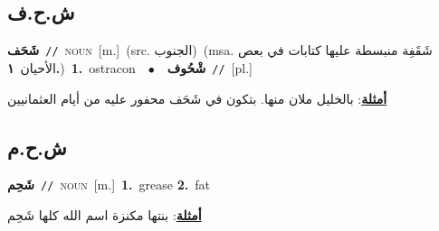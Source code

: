 \documentclass[10pt,a4paper,twoside]{article} %
\begin{document}
\begin{multicols}{2}
\vspace{-3mm}
\subsection*{\color{blue}\foreignlanguage{arabic}{ش.ح.ف}\color{blue}{}} 

{\setlength\topsep{0pt}\textbf{\foreignlanguage{arabic}{شَحَف}}\ {\color{gray}\texttt{//}\color{black}}\ \textsc{noun}\ [m.]\ (src. \color{gray}\foreignlanguage{arabic}{الجنوب}\color{black})\ \color{gray}(msa. \foreignlanguage{arabic}{شَقَفِة منبسطة عليها كتابات في بعص الأحيان}~\foreignlanguage{arabic}{\textbf{١.}})\color{black}\ \textbf{1.}~ostracon\ \ $\bullet$\ \ \setlength\topsep{0pt}\textbf{\foreignlanguage{arabic}{شْحُوف}}\ {\color{gray}\texttt{//}\color{black}}\ [pl.]\  \begin{flushright}\color{gray}\foreignlanguage{arabic}{\textbf{\underline{\foreignlanguage{arabic}{أمثلة}}}: بالخليل ملان منها. بتكون في شَحَف محفور عليه من أيام العثمانيين}\end{flushright}\color{black}} \vspace{2mm}

\vspace{-3mm}
\subsection*{\color{blue}\foreignlanguage{arabic}{ش.ح.م}\color{blue}{}} 

{\setlength\topsep{0pt}\textbf{\foreignlanguage{arabic}{شَحِم}}\ {\color{gray}\texttt{//}\color{black}}\ \textsc{noun}\ [m.]\ \textbf{1.}~grease  \textbf{2.}~fat\  \begin{flushright}\color{gray}\foreignlanguage{arabic}{\textbf{\underline{\foreignlanguage{arabic}{أمثلة}}}: بنتها مكنزة اسم الله كلها شَحِم}\end{flushright}\color{black}} \vspace{2mm}


\end{multicols}
\end{document}
